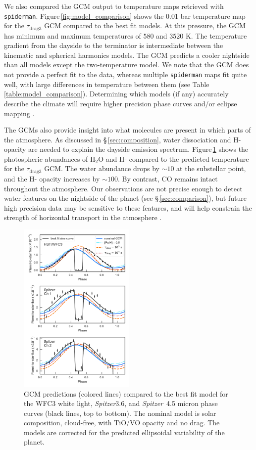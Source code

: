 \documentclass[twocolumn]{aastex61}
\newcommand{\project}[1]{\textsl{#1}}
\newcommand{\Spitzer}{\project{Spitzer}}
\begin{document}
We also compared the GCM output to temperature maps retrieved with \texttt{spiderman}. Figure\,\ref{fig:model_comparison} shows the 0.01 bar temperature map for the $\tau_\mathrm{drag3}$ GCM compared to the best fit models. At this pressure, the GCM has minimum and maximum temperatures of $580$ and $3520$ K. The temperature gradient from the dayside to the terminator is intermediate between the kinematic and spherical harmonics models. The GCM predicts a cooler nightside than all models except the two-temperature model. We note that the GCM does not provide a perfect fit to the data, whereas multiple \texttt{spiderman} maps fit quite well, with large differences in temperature between them (see Table \,\ref{table:model_comparison}). Determining which models (if any) accurately describe the climate will require higher precision phase curves and/or eclipse mapping \citep[e.g.][]{dewit12}. 

The GCMs also provide insight into what molecules are present in which parts of the atmosphere. As discussed in \S\,\ref{sec:composition}, water dissociation and H- opacity are needed to explain the dayside emission spectrum. Figure\,\ref{fig:gcmcomparison} shows the photospheric abundances of H$_2$O and H- compared to the predicted temperature for the $\tau_\mathrm{drag3}$ GCM. The water abundance drops by $\sim10$ at the substellar point, and the H- opacity increases by $\sim100$.  By contrast, CO remains intact throughout the atmosphere.  Our observations are not precise enough to detect water features on the nightside of the planet (see \S\,\ref{sec:comparison}), but future high precision data may be sensitive to these features, and will help constrain the strength of horizontal transport in the atmosphere \citep{agundez14}.

\begin{figure}
\includegraphics[width = 0.5\textwidth]{Figures/gcm_comparison.pdf}
\caption{GCM predictions (colored lines) compared to the best fit model for the WFC3 white light, \Spitzer 3.6, and \Spitzer\ 4.5 micron phase curves (black lines, top to bottom). The nominal model is solar composition, cloud-free, with TiO/VO opacity and no drag. The models are corrected for the predicted ellipsoidal variability of the planet.}
\label{fig:gcmcomparison}
\end{figure}
\end{document}
